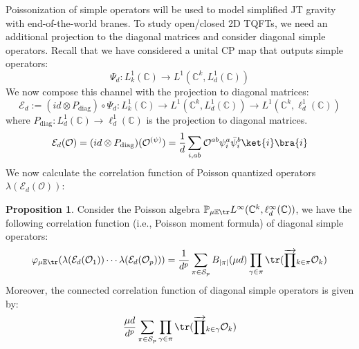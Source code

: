 \documentclass[a4paper,11pt]{article}
\theoremstyle{definition}
\numberwithin{equation}{section}
\newtheorem{proposition}{Proposition}[section]
\begin{document}
Poissonization of simple operators will be used to model simplified JT gravity with end-of-the-world branes. To study open/closed 2D TQFTs, we need an additional projection to the diagonal matrices and consider diagonal simple operators. Recall that we have considered a unital CP map that outputs simple operators:
\begin{equation}
\Psi_d: L_k^1(\mathbb{C})\rightarrow L^1(\mathbb{C}^k,L^1_d(\mathbb{C}))
\end{equation}
We now compose this channel with the projection to diagonal matrices:
\begin{equation}
    \mathcal{E}_d:=(id\otimes P_\text{diag})\circ\Psi_d: L_k^1(\mathbb{C})\rightarrow L^1(\mathbb{C}^k, L_d^1(\mathbb{C}))\rightarrow L^1(\mathbb{C}^k, \ell_d^1(\mathbb{C}))
\end{equation}
where $P_\text{diag}: L^1_d(\mathbb{C})\rightarrow\ell^1_d(\mathbb{C})$ is the projection to diagonal matrices.
\begin{equation}
    \mathcal{E}_d(\mathcal{O}) = (id\otimes P_\text{diag})(\mathcal{O}^{(\psi)}) = \frac{1}{d}\sum_{i,ab}\mathcal{O}^{ab}\psi^a_i\bar{\psi}^b_i\ket{i}\bra{i}
\end{equation}
We now calculate the correlation function of Poisson quantized operators $\lambda(\mathcal{E}_d(\mathcal{O}))$:
\begin{proposition}
    Consider the Poisson algebra $\mathbb{P}_{\mu\mathbb{E}\tr}L^\infty(\mathbb{C}^k, \ell_d^\infty(\mathbb{C}))$, we have the following correlation function (i.e., Poisson moment formula) of diagonal simple operators:
    \begin{equation}
        \varphi_{\mu\mathbb{E}\tr}(\lambda(\mathcal{E}_d(\mathcal{O}_1))\cdots\lambda(\mathcal{E}_d(\mathcal{O}_p))) = \frac{1}{d^p}\sum_{\pi\in \mathcal{S}_p}B_{|\pi|}(\mu d)\prod_{\gamma\in\pi}\tr(\overrightarrow{\prod}_{k\in\pi}\mathcal{O}_k)
    \end{equation}
    Moreover, the connected correlation function of diagonal simple operators is given by:
    \begin{equation}
        \frac{\mu d}{d^p}\sum_{\pi\in \mathcal{S}_p}\prod_{\gamma\in\pi}\tr(\overrightarrow{\prod}_{k\in\gamma}\mathcal{O}_k)
    \end{equation}
\end{proposition}
\end{document}
